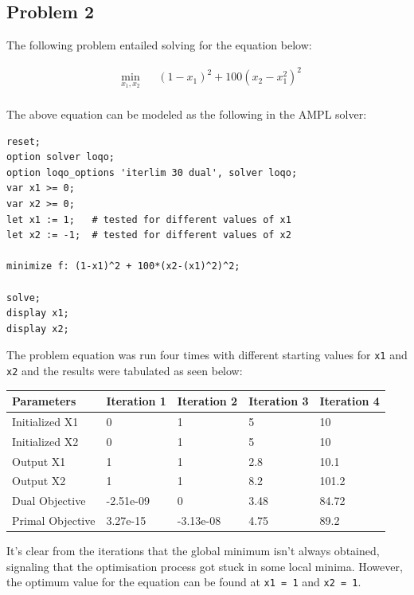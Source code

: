 \subsection{Problem 2}

The following problem entailed solving for the equation below:

\begin{equation*}
\begin{aligned}
& \underset{x_1,x_2}{\text{min}}
& & (1 - x_1)^2 + 100(x_2 - x_1^2)^2  \\ 
\end{aligned}
\end{equation*}

The above equation can be modeled as the following in the AMPL solver:

\begin{verbatim}
reset;
option solver loqo;
option loqo_options 'iterlim 30 dual', solver loqo;
var x1 >= 0;
var x2 >= 0;
let x1 := 1;   # tested for different values of x1
let x2 := -1;  # tested for different values of x2

minimize f: (1-x1)^2 + 100*(x2-(x1)^2)^2;

solve;
display x1;
display x2;
\end{verbatim}

The problem equation was run four times with different starting values for \texttt{x1} and \texttt{x2} and the results were tabulated as seen below:

\begin{center}
	\begin{tabu} to 0.95\textwidth { |X[c]|X[c]X[c]X[c]X[c]| }
		\hline
		Parameters & Iteration 1 & Iteration 2 & Iteration 3 & Iteration 4 \\
		\hline
		Initialized X1 & 0 & 1 & 5 & 10 \\
		Initialized X2 & 0 & 1 & 5 & 10 \\
		Output X1 & 1 & 1 & 2.8 & 10.1 \\
		Output X2 & 1 & 1 & 8.2 & 101.2 \\
		Dual Objective & -2.51e-09 & 0 & 3.48 & 84.72 \\
		Primal Objective & 3.27e-15 & -3.13e-08 & 4.75 & 89.2 \\
		\hline
	\end{tabu}
\end{center}

It's clear from the iterations that the global minimum isn't always obtained, signaling that the optimisation process got stuck in some local minima. However, the optimum value for the equation can be found at \texttt{x1 = 1} and \texttt{x2 = 1}.


